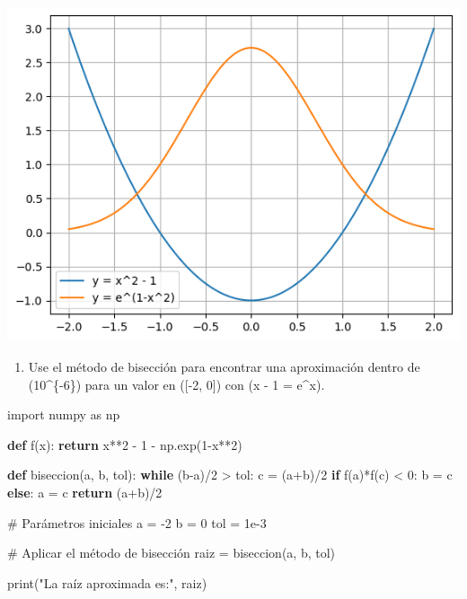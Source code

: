 \documentclass[
  letterpaper,
  DIV=11,
  numbers=noendperiod]{scrartcl}
\newenvironment{Shaded}{\begin{snugshade}}{\end{snugshade}}
\newcommand{\BuiltInTok}[1]{\textcolor[rgb]{0.00,0.23,0.31}{#1}}
\newcommand{\CommentTok}[1]{\textcolor[rgb]{0.37,0.37,0.37}{#1}}
\newcommand{\ControlFlowTok}[1]{\textcolor[rgb]{0.00,0.23,0.31}{\textbf{#1}}}
\newcommand{\DecValTok}[1]{\textcolor[rgb]{0.68,0.00,0.00}{#1}}
\newcommand{\FloatTok}[1]{\textcolor[rgb]{0.68,0.00,0.00}{#1}}
\newcommand{\ImportTok}[1]{\textcolor[rgb]{0.00,0.46,0.62}{#1}}
\newcommand{\KeywordTok}[1]{\textcolor[rgb]{0.00,0.23,0.31}{\textbf{#1}}}
\newcommand{\NormalTok}[1]{\textcolor[rgb]{0.00,0.23,0.31}{#1}}
\newcommand{\OperatorTok}[1]{\textcolor[rgb]{0.37,0.37,0.37}{#1}}
\newcommand{\StringTok}[1]{\textcolor[rgb]{0.13,0.47,0.30}{#1}}
\providecommand{\tightlist}{%
  \setlength{\itemsep}{0pt}\setlength{\parskip}{0pt}}\usepackage{longtable,booktabs,array}
\begin{document}
\includegraphics{Deber3_files/figure-pdf/cell-3-output-1.png}

\begin{enumerate}
\def\labelenumi{\arabic{enumi}.}
\setcounter{enumi}{1}
\tightlist
\item
  Use el método de bisección para encontrar una aproximación dentro de
  (10\^{}\{-6\}) para un valor en ({[}-2, 0{]}) con (x - 1 = e\^{}x).
\end{enumerate}

\begin{Shaded}
\begin{Highlighting}[]
\ImportTok{import}\NormalTok{ numpy }\ImportTok{as}\NormalTok{ np}

\KeywordTok{def}\NormalTok{ f(x):}
    \ControlFlowTok{return}\NormalTok{ x}\OperatorTok{**}\DecValTok{2} \OperatorTok{{-}} \DecValTok{1} \OperatorTok{{-}}\NormalTok{ np.exp(}\DecValTok{1}\OperatorTok{{-}}\NormalTok{x}\OperatorTok{**}\DecValTok{2}\NormalTok{)}

\KeywordTok{def}\NormalTok{ biseccion(a, b, tol):}
    \ControlFlowTok{while}\NormalTok{ (b}\OperatorTok{{-}}\NormalTok{a)}\OperatorTok{/}\DecValTok{2} \OperatorTok{\textgreater{}}\NormalTok{ tol:}
\NormalTok{        c }\OperatorTok{=}\NormalTok{ (a}\OperatorTok{+}\NormalTok{b)}\OperatorTok{/}\DecValTok{2}
        \ControlFlowTok{if}\NormalTok{ f(a)}\OperatorTok{*}\NormalTok{f(c) }\OperatorTok{\textless{}} \DecValTok{0}\NormalTok{:}
\NormalTok{            b }\OperatorTok{=}\NormalTok{ c}
        \ControlFlowTok{else}\NormalTok{:}
\NormalTok{            a }\OperatorTok{=}\NormalTok{ c}
    \ControlFlowTok{return}\NormalTok{ (a}\OperatorTok{+}\NormalTok{b)}\OperatorTok{/}\DecValTok{2}

\CommentTok{\# Parámetros iniciales}
\NormalTok{a }\OperatorTok{=} \OperatorTok{{-}}\DecValTok{2}
\NormalTok{b }\OperatorTok{=} \DecValTok{0}
\NormalTok{tol }\OperatorTok{=} \FloatTok{1e{-}3}

\CommentTok{\# Aplicar el método de bisección}
\NormalTok{raiz }\OperatorTok{=}\NormalTok{ biseccion(a, b, tol)}

\BuiltInTok{print}\NormalTok{(}\StringTok{"La raíz aproximada es:"}\NormalTok{, raiz)}
\end{Highlighting}
\end{Shaded}
\end{document}
